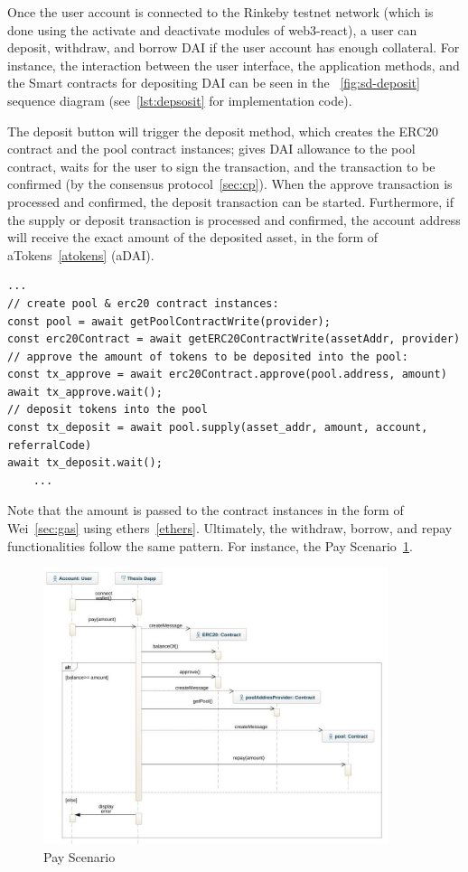 \documentclass[11pt,a4paper]{report}
\begin{document}
Once the user account is connected to the Rinkeby testnet  network (which is done using the activate and deactivate modules of web3-react), a user can deposit, withdraw, and borrow DAI if the user account has enough collateral. For instance, the interaction between the user interface, the application methods, and the Smart contracts for depositing DAI can be seen in the ~\ref{fig:sd-deposit} sequence diagram (see~\ref{lst:depsosit} for implementation code).

The deposit button will trigger the deposit method, which creates the ERC20 contract and the pool contract instances; gives DAI allowance to the pool contract, waits for the user to sign the transaction, and the transaction to be confirmed (by the consensus protocol~\ref{sec:cp}). When the approve transaction is processed and confirmed, the deposit transaction can be started. Furthermore, if the supply or deposit transaction is processed and confirmed, the account address will receive the exact amount of the deposited asset, in the form of aTokens~\ref{atokens} (aDAI).
\begin{lstlisting}[frame=single, caption={Deposit Procedure},label={lst:depsosit}]
	...
// create pool & erc20 contract instances:
const pool = await getPoolContractWrite(provider);
const erc20Contract = await getERC20ContractWrite(assetAddr, provider)
// approve the amount of tokens to be deposited into the pool:
const tx_approve = await erc20Contract.approve(pool.address, amount)
await tx_approve.wait();
// deposit tokens into the pool
const tx_deposit = await pool.supply(asset_addr, amount, account, referralCode)
await tx_deposit.wait();
	...
\end{lstlisting}
Note that the amount is passed to the contract instances in the form of Wei~\ref{sec:gas} using ethers~\ref{ethers}. Ultimately, the withdraw, borrow, and repay functionalities follow the same pattern. For instance, the Pay Scenario~\ref{fig:sd-pay}.
\begin{figure}[htp]
	\centering
	\includegraphics[width=0.9\textwidth]{./images/sequence-repay2}
	\caption{Pay Scenario}
	\label{fig:sd-pay}
\end{figure}
\end{document}

